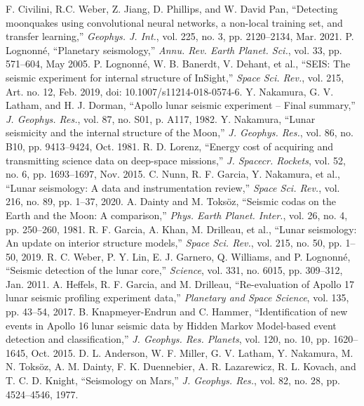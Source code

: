 \documentclass[conference]{IEEEtran}
\begin{document}
\begin{thebibliography}{00}
     F. Civilini, R.C. Weber, Z. Jiang, D. Phillips, and W. David Pan, ``Detecting moonquakes using convolutional neural networks, a non-local training set, and transfer learning,'' \emph{Geophys. J. Int.}, vol. 225, no. 3, pp. 2120--2134, Mar. 2021.
      P. Lognonné, ``Planetary seismology,'' \emph{Annu. Rev. Earth Planet. Sci.}, vol. 33, pp. 571--604, May 2005.
     P. Lognonné, W. B. Banerdt, V. Dehant, et al., ``SEIS: The seismic experiment for internal structure of InSight,'' \emph{Space Sci. Rev.}, vol. 215, Art. no. 12, Feb. 2019, doi: 10.1007/s11214-018-0574-6.
     Y. Nakamura, G. V. Latham, and H. J. Dorman, ``Apollo lunar seismic experiment – Final summary,'' \emph{J. Geophys. Res.}, vol. 87, no. S01, p. A117, 1982.
     Y. Nakamura, ``Lunar seismicity and the internal structure of the Moon,'' \emph{J. Geophys. Res.}, vol. 86, no. B10, pp. 9413--9424, Oct. 1981.
     R. D. Lorenz, ``Energy cost of acquiring and transmitting science data on deep-space missions,'' \emph{J. Spacecr. Rockets}, vol. 52, no. 6, pp. 1693--1697, Nov. 2015.
     C. Nunn, R. F. Garcia, Y. Nakamura, et al., ``Lunar seismology: A data and instrumentation review,'' \emph{Space Sci. Rev.}, vol. 216, no. 89, pp. 1--37, 2020.
     A. Dainty and M. Toksöz, ``Seismic codas on the Earth and the Moon: A comparison,'' \emph{Phys. Earth Planet. Inter.}, vol. 26, no. 4, pp. 250--260, 1981.
     R. F. Garcia, A. Khan, M. Drilleau, et al., ``Lunar seismology: An update on interior structure models,'' \emph{Space Sci. Rev.}, vol. 215, no. 50, pp. 1--50, 2019.
     R. C. Weber, P. Y. Lin, E. J. Garnero, Q. Williams, and P. Lognonné, ``Seismic detection of the lunar core,'' \emph{Science}, vol. 331, no. 6015, pp. 309--312, Jan. 2011.
     A. Heffels, R. F. Garcia, and M. Drilleau, ``Re-evaluation of Apollo 17 lunar seismic profiling experiment data,'' \emph{Planetary and Space Science}, vol. 135, pp. 43--54, 2017.
     B. Knapmeyer-Endrun and C. Hammer, ``Identification of new events in Apollo 16 lunar seismic data by Hidden Markov Model-based event detection and classification,'' \emph{J. Geophys. Res. Planets}, vol. 120, no. 10, pp. 1620--1645, Oct. 2015.
     D. L. Anderson, W. F. Miller, G. V. Latham, Y. Nakamura, M. N. Toksöz, A. M. Dainty, F. K. Duennebier, A. R. Lazarewicz, R. L. Kovach, and T. C. D. Knight, ``Seismology on Mars,'' \emph{J. Geophys. Res.}, vol. 82, no. 28, pp. 4524--4546, 1977.

\end{thebibliography}
\end{document}
